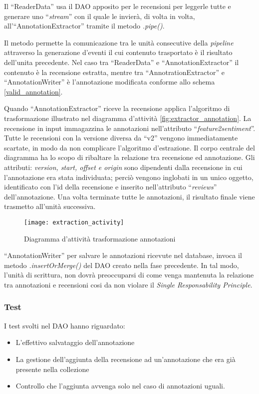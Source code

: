 Il ``ReaderData'' usa il \gls{DAO} apposito per le recensioni per leggerle tutte
e generare uno ``\textit{stream}'' con il quale le invierà, di volta in volta,
all'``AnnotationExtractor'' tramite il metodo \textit{.pipe()}.

Il metodo permette la comunicazione tra le unità consecutive della
\textit{pipeline} attraverso la generazione d'eventi il cui contenuto
trasportato è il risultato dell'unita precedente. Nel caso tra ``ReaderData'' e
``AnnotationExtractor'' il contenuto è la recensione estratta, mentre tra
``AnnotrationExtractor'' e ``AnnotationWriter'' è l'annotazione modificata
conforme allo schema \ref{valid_annotation}.

Quando ``AnnotationExtractor'' riceve la recensione applica l'algoritmo di
trasformazione illustrato nel diagramma d'attività
\ref{fig:extractor_annotation}. La recensione in input immagazzina le
annotazioni nell'attributo ``\textit{feature2sentiment}''. Tutte le recensioni
con la versione diversa da ``v2'' vengono immediatamente scartate, in modo da
non complicare l'algoritmo d'estrazione. Il corpo centrale del diagramma ha lo
scopo di ribaltare la relazione tra recensione ed annotazione. Gli attributi:
\textit{version, start, offset e origin} sono dipendenti dalla recensione in
cui l'annotazione era stata individuata; perciò vengono inglobati in un unico
oggetto, identificato con l'id della recensione e inserito nell'attributo
``\textit{reviews}'' dell'annotazione. Una volta terminate tutte le annotazioni,
il risultato finale viene trasmetto all'unità successiva.

\begin{figure}[H]
\begin{center}
\texttt{[image: extraction\_activity]}
\caption{
Diagramma d'attività trasformazione annotazioni
}
\label{fig:extraction_activity}
\end{center}
\end{figure}

``AnnotationWriter'' per salvare le annotazioni ricevute nel database, invoca il
metodo \textit{.insertOrMerge()} del \gls{DAO} creato nella fase precedente. In
tal modo, l'unità di scrittura, non dovrà preoccuparsi di come venga mantenuta
la relazione tra annotazioni e recensioni cosi da non violare il
\textit{Single Responsability Principle}.

\subsubsection{Test}
I test svolti nel \gls{DAO} hanno riguardato:
\begin{itemize}
\item L'effettivo salvataggio dell'annotazione
\item La gestione dell'aggiunta della recensione ad un'annotazione che era già
presente nella collezione
\item Controllo che l'aggiunta avvenga solo nel caso di annotazioni uguali.
\end{itemize}

